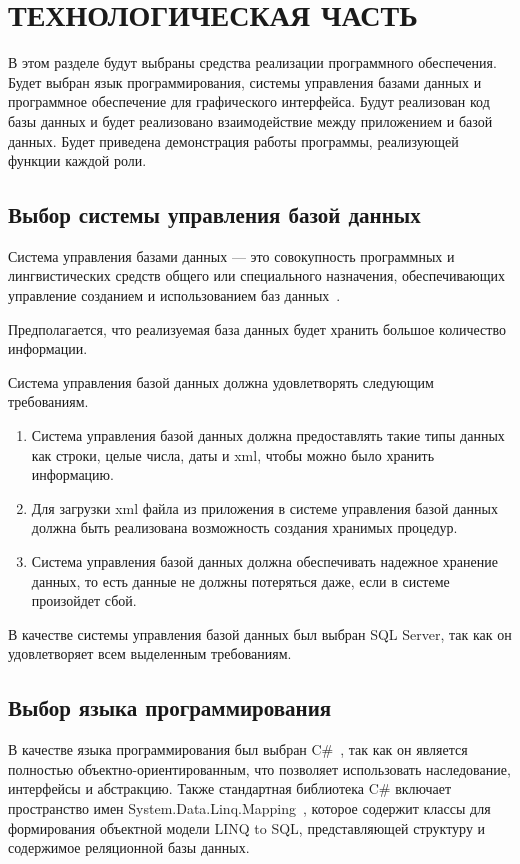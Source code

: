 \chapter{ТЕХНОЛОГИЧЕСКАЯ ЧАСТЬ}

В этом разделе будут выбраны средства реализации программного обеспечения. Будет выбран язык программирования, системы управления базами данных и программное обеспечение для графического интерфейса. Будут реализован код базы данных и будет реализовано взаимодействие между приложением и базой данных. Будет приведена демонстрация работы программы, реализующей функции каждой роли.

\section{Выбор системы управления базой данных}

Система управления базами данных --- это совокупность программных и лингвистических средств общего или специального назначения, обеспечивающих управление созданием и использованием баз данных~\cite{database}.

Предполагается, что реализуемая база данных будет хранить большое количество информации.

Система управления базой данных должна удовлетворять следующим требованиям.

\begin{enumerate}
	\item Система управления базой данных должна предоставлять такие типы данных как строки, целые числа, даты и xml, чтобы можно было хранить информацию. 
	\item Для загрузки xml файла из приложения в системе управления базой данных должна быть реализована возможность создания хранимых процедур. 
	\item Система управления базой данных должна обеспечивать надежное хранение данных, то есть данные не должны потеряться даже, если в системе произойдет сбой.
\end{enumerate} 

В качестве системы управления базой данных был выбран SQL Server, так как он удовлетворяет всем выделенным требованиям.

\section{Выбор языка программирования}

В качестве языка программирования был выбран C\#~\cite{sharp}, так как он является полностью объектно-ориентированным, что позволяет использовать наследование, интерфейсы и абстракцию. Также стандартная библиотека C\# включает пространство имен System.Data.Linq.Mapping~\cite{datalinqmapping}, которое содержит классы для формирования объектной модели LINQ to SQL, представляющей структуру и содержимое реляционной базы данных.

